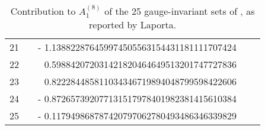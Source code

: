 \begin{table}[h]
\begin{center}
\begin{tabular}{rrrrr}
   21 &  & - 1.138822876459974505563154431181111707424  \\%
   22 &  & \phantom{+} 0.598842072031421820464649513201747727836  \\%
   23 &  & \phantom{+} 0.822284485811034346719894048799598422606  \\%
   24 &  & - 0.872657392077131517978401982381415610384  \\%
   25 &  & - 0.117949868787420797062780493486346339829  \\%
\hline
\end{tabular}
\end{center}
\caption{
Contribution to $A^{(8)}_1$ of the 25 gauge-invariant sets of
, as reported by Laporta.
}
\label{Laporta17:tableset}
\end{table}

